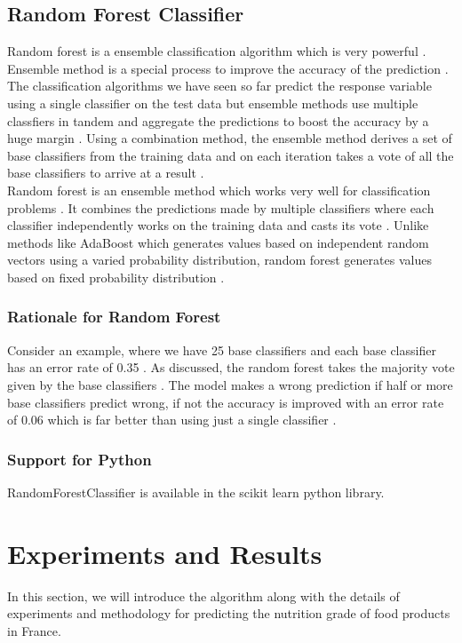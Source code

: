 \documentclass[sigconf]{acmart}
\begin{document}
\subsection{Random Forest Classifier}
Random forest is a ensemble classification algorithm which is very powerful \cite{book-tan}. Ensemble method is a special process to improve the accuracy of the prediction \cite{book-tan}. The classification algorithms we have seen so far predict the response variable using a single classifier on the test data but ensemble methods use multiple classfiers in tandem and aggregate the predictions to boost the accuracy by a huge margin \cite{book-tan}. Using a combination method, the ensemble method derives a set of base classifiers from the training data and on each iteration takes a vote of all the base classifiers to arrive at a result \cite{book-tan}. \\

Random forest is an ensemble method which works very well for classification problems \cite{book-tan}. It combines the predictions made by multiple classifiers where each classifier independently works on the training data and casts its vote \cite{book-tan}. Unlike methods like AdaBoost which generates values based on independent random vectors using a varied probability distribution, random forest generates values based on fixed probability distribution \cite{book-tan}. 

\subsubsection{Rationale for Random Forest}
Consider an example, where we have 25 base classifiers and each base classifier has an error rate of 0.35 \cite{book-tan}. As discussed, the random forest takes the majority vote given by the base classifiers \cite{book-tan}. The model makes a wrong prediction if half or more base classifiers predict wrong, if not the accuracy is improved with an error rate of 0.06 which is far better than using just a single classifier \cite{book-tan}.

\subsubsection{Support for Python} RandomForestClassifier is available in the scikit learn python library.

\section {Experiments and Results}
In this section, we will introduce the algorithm along with the details of experiments and methodology for predicting the nutrition grade of food products in France.
\end{document}
